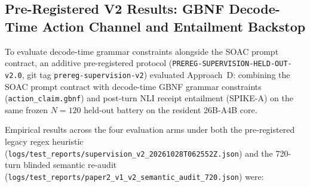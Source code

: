 \documentclass[11pt,a4paper]{article}
\begin{document}
\subsection{Pre-Registered V2 Results: GBNF Decode-Time Action Channel and Entailment Backstop}
\label{sec:v2_supervision_results}
To evaluate decode-time grammar constraints alongside the SOAC prompt contract, an additive pre-registered protocol (\texttt{PREREG-SUPERVISION-HELD-OUT-v2.0}, git tag \texttt{prereg-supervision-v2}) evaluated Approach~D: combining the SOAC prompt contract with decode-time GBNF grammar constraints (\texttt{action\_claim.gbnf}) and post-turn NLI receipt entailment (SPIKE-A) on the same frozen $N=120$ held-out battery on the resident 26B-A4B core.

Empirical results across the four evaluation arms under both the pre-registered legacy regex heuristic (\texttt{logs/test\_reports/supervision\_v2\_20261028T062552Z.json}) and the 720-turn blinded semantic re-audit (\texttt{logs/test\_reports/paper2\_v1\_v2\_semantic\_audit\_720.json}) were:
\end{document}
